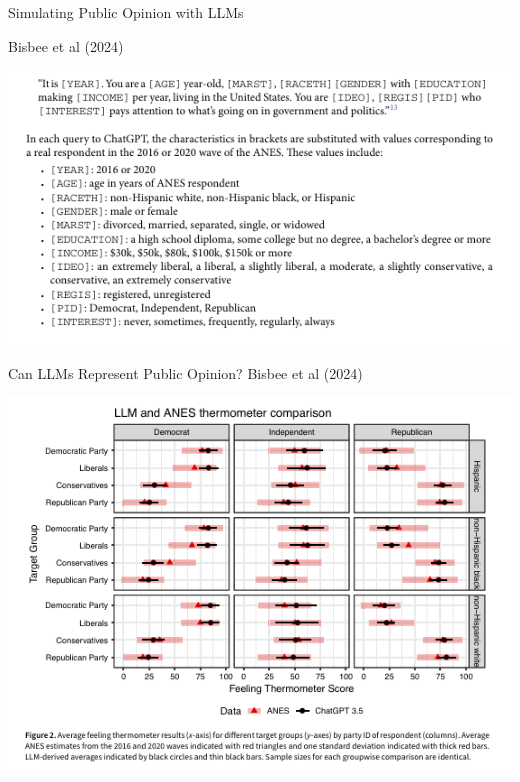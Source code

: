 \documentclass[10pt,aspectratio=169]{beamer}
\newcommand{\nblue}[1]{{\color{ceruleanblue} {#1}}}
\begin{document}
\begin{frame}{Simulating Public Opinion with LLMs}

	\nblue{Bisbee et al (2024)}
	\begin{center}
		\includegraphics[width=.7\textwidth]{figures/bisbee_prompt.png}
	\end{center}
\end{frame}



\begin{frame}{Can LLMs Represent Public Opinion?}
	\nblue{Bisbee et al (2024)}
	\begin{center}
		\includegraphics[width=.6\textwidth]{figures/bisbee_results.png}
	\end{center}

\end{frame}
\end{document}

